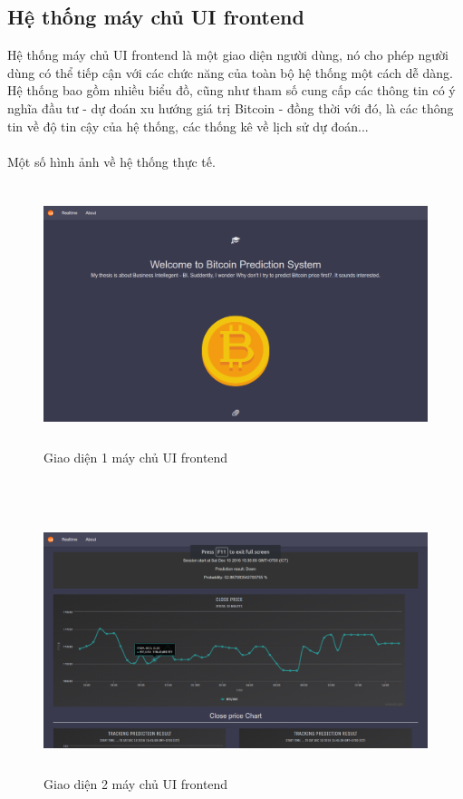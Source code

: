 \subsection{Hệ thống máy chủ UI frontend}
Hệ thống máy chủ UI frontend là một giao diện người dùng, nó cho phép người 
dùng có thể tiếp cận với các chức năng của toàn bộ hệ thống một cách dễ dàng. 
Hệ thống bao gồm nhiều biểu đồ, cũng như tham số cung cấp các thông tin có ý 
nghĩa đầu tư - dự đoán xu hướng giá trị Bitcoin - đồng thời với đó, là các 
thông tin về độ tin cậy của hệ thống, các thống kê về lịch sử dự đoán...\\\\
Một số hình ảnh về hệ thống thực tế.\\
\begin{figure}[h!]
\centering
\includegraphics[height=3in, keepaspectratio=true]{1.png}
\caption{Giao diện 1 máy chủ UI frontend}
\end{figure}\\
\begin{figure}[h!]
\centering
\includegraphics[height=3in, keepaspectratio=true]{2.png}
\caption{Giao diện 2 máy chủ UI frontend}
\end{figure}\\\\
